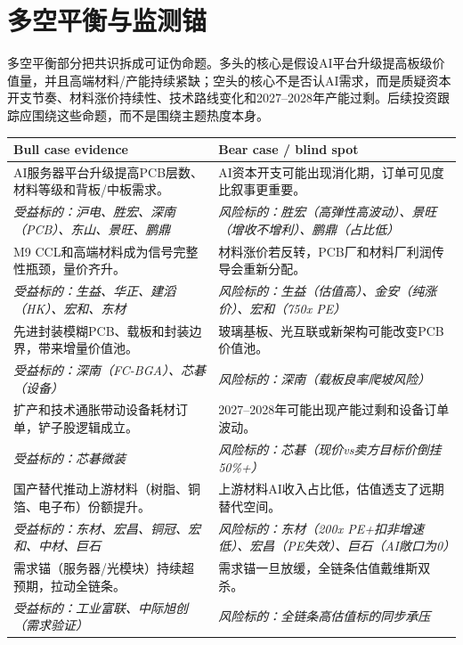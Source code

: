 \section{多空平衡与监测锚}

多空平衡部分把共识拆成可证伪命题。多头的核心是假设AI平台升级提高板级价值量，并且高端材料/产能持续紧缺；空头的核心不是否认AI需求，而是质疑资本开支节奏、材料涨价持续性、技术路线变化和2027--2028年产能过剩。后续投资跟踪应围绕这些命题，而不是围绕主题热度本身。

\begin{dashboardbox}
\small
\begin{tabularx}{\textwidth}{X X}
\toprule
\textbf{Bull case evidence} & \textbf{Bear case / blind spot} \\
\midrule
AI服务器平台升级提高PCB层数、材料等级和背板/中板需求。 & AI资本开支可能出现消化期，订单可见度比叙事更重要。 \\
\textit{受益标的：沪电、胜宏、深南（PCB）、东山、景旺、鹏鼎} & \textit{风险标的：胜宏（高弹性高波动）、景旺（增收不增利）、鹏鼎（占比低）} \\
\midrule
M9 CCL和高端材料成为信号完整性瓶颈，量价齐升。 & 材料涨价若反转，PCB厂和材料厂利润传导会重新分配。 \\
\textit{受益标的：生益、华正、建滔（HK）、宏和、东材} & \textit{风险标的：生益（估值高）、金安（纯涨价）、宏和（750x PE）} \\
\midrule
先进封装模糊PCB、载板和封装边界，带来增量价值池。 & 玻璃基板、光互联或新架构可能改变PCB价值池。 \\
\textit{受益标的：深南（FC-BGA）、芯碁（设备）} & \textit{风险标的：深南（载板良率爬坡风险）} \\
\midrule
扩产和技术通胀带动设备耗材订单，铲子股逻辑成立。 & 2027--2028年可能出现产能过剩和设备订单波动。 \\
\textit{受益标的：芯碁微装} & \textit{风险标的：芯碁（现价vs卖方目标价倒挂50\%+）} \\
\midrule
国产替代推动上游材料（树脂、铜箔、电子布）份额提升。 & 上游材料AI收入占比低，估值透支了远期替代空间。 \\
\textit{受益标的：东材、宏昌、铜冠、宏和、中材、巨石} & \textit{风险标的：东材（200x PE+扣非增速低）、宏昌（PE失效）、巨石（AI敞口为0）} \\
\midrule
需求锚（服务器/光模块）持续超预期，拉动全链条。 & 需求锚一旦放缓，全链条估值戴维斯双杀。 \\
\textit{受益标的：工业富联、中际旭创（需求验证）} & \textit{风险标的：全链条高估值标的同步承压} \\
\bottomrule
\end{tabularx}
\end{dashboardbox}

